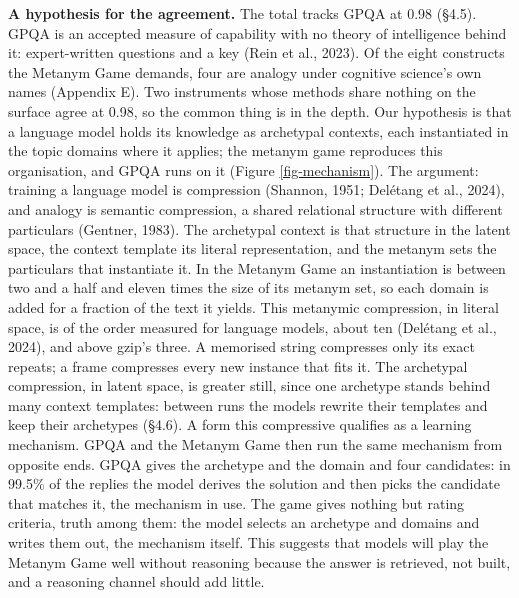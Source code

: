 \documentclass{article}
\begin{document}
\textbf{A hypothesis for the agreement.} The total tracks GPQA at 0.98 (\S{}4.5). GPQA is an accepted measure of capability with no theory of intelligence behind it: expert-written questions and a key (Rein et al., 2023). Of the eight constructs the Metanym Game demands, four are analogy under cognitive science's own names (Appendix E). Two instruments whose methods share nothing on the surface agree at 0.98, so the common thing is in the depth. Our hypothesis is that a language model holds its knowledge as archetypal contexts, each instantiated in the topic domains where it applies; the metanym game reproduces this organisation, and GPQA runs on it (Figure \ref{fig-mechanism}). The argument: training a language model is compression (Shannon, 1951; Del\'{e}tang et al., 2024), and analogy is semantic compression, a shared relational structure with different particulars (Gentner, 1983). The archetypal context is that structure in the latent space, the context template its literal representation, and the metanym sets the particulars that instantiate it. In the Metanym Game an instantiation is between two and a half and eleven times the size of its metanym set, so each domain is added for a fraction of the text it yields. This metanymic compression, in literal space, is of the order measured for language models, about ten (Del\'{e}tang et al., 2024), and above gzip's three. A memorised string compresses only its exact repeats; a frame compresses every new instance that fits it. The archetypal compression, in latent space, is greater still, since one archetype stands behind many context templates: between runs the models rewrite their templates and keep their archetypes (\S{}4.6). A form this compressive qualifies as a learning mechanism. GPQA and the Metanym Game then run the same mechanism from opposite ends. GPQA gives the archetype and the domain and four candidates: in 99.5\% of the replies the model derives the solution and then picks the candidate that matches it, the mechanism in use. The game gives nothing but rating criteria, truth among them: the model selects an archetype and domains and writes them out, the mechanism itself. This suggests that models will play the Metanym Game well without reasoning because the answer is retrieved, not built, and a reasoning channel should add little.
\end{document}
